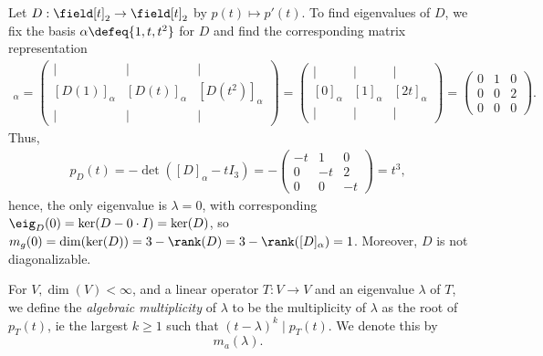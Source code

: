\begin{example}
    Let $D : \field[t]_2 \to \field[t]_2$ by $p(t) \mapsto p'(t)$. To find eigenvalues of $D$, we fix the basis $\alpha \defeq \{1, t, t^2\}$ for $D$ and find the corresponding matrix representation
    \begin{align*}
        [D]_\alpha = \begin{pmatrix}
            \vert & \vert & \vert\\
            [D(1)]_\alpha & [D(t)]_\alpha & [D(t^2)]_\alpha \\
            \vert & \vert & \vert
        \end{pmatrix} = \begin{pmatrix}
            \vert & \vert & \vert\\
            [0]_\alpha & [1]_\alpha & [2t]_\alpha\\
            \vert & \vert & \vert
        \end{pmatrix} = \begin{pmatrix}
            0 & 1 & 0 \\
            0 & 0 & 2\\
            0 & 0 & 0
        \end{pmatrix}.
    \end{align*}
    Thus, \begin{align*}
        p_D(t) = - \det([D]_\alpha - tI_3) = - \begin{pmatrix}
            -t & 1 & 0\\
            0 & -t & 2 \\
            0 & 0 & -t
        \end{pmatrix} = t^3,
    \end{align*}
    hence, the only eigenvalue is $\lambda = 0$, with corresponding $\eig_D(0) = \ker(D - 0 \cdot I) = \ker(D)$, so $m_g(0) = \dim(\ker(D)) = 3 - \rank(D) = 3 - \rank([D]_\alpha) = 1$. Moreover, $D$ is not diagonalizable.
\end{example}

\begin{definition}
    For $V, \dim(V) < \infty$, and a linear operator $T : V \to V$ and an eigenvalue $\lambda$ of $T$, we define the \emph{algebraic multiplicity} of $\lambda$ to be the multiplicity of $\lambda$ as the root of $p_T(t)$, ie the largest $k \geq 1$ such that $(t - \lambda)^k \mid p_T(t)$. We denote this by \[
    m_a(\lambda).    
    \]
\end{definition}


